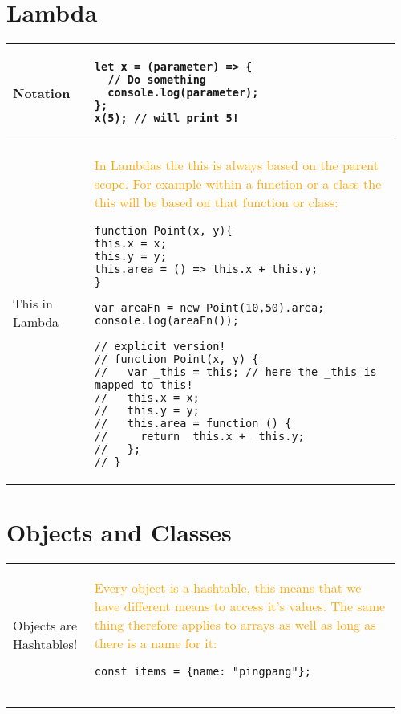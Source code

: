 \documentclass[main.tex,fontsize=8pt,paper=a4,paper=portrait,DIV=calc,]{scrartcl}
\begin{document}
\begin{table}[ht!]
\section{Lambda}
\begin{tabular}{|m{0.2\linewidth}|m{0.755\linewidth}|}
\hline
Notation & 
\begin{lstlisting}
let x = (parameter) => {
  // Do something
  console.log(parameter);
};
x(5); // will print 5!
\end{lstlisting}\\
\hline
This in Lambda &
\textcolor{orange}{In Lambdas the this is always based on the parent scope.\newline
For example within a function or a class the this will be based on that function or class:}\newline
\begin{lstlisting}
function Point(x, y){
this.x = x;
this.y = y;
this.area = () => this.x + this.y;
}

var areaFn = new Point(10,50).area;
console.log(areaFn());

// explicit version!
// function Point(x, y) {
//   var _this = this; // here the _this is mapped to this!
//   this.x = x;
//   this.y = y;
//   this.area = function () {
//     return _this.x + _this.y;
//   };
// }
\end{lstlisting}\\
\hline
\end{tabular}
\section{Objects and Classes}
\begin{tabular}{|m{0.2\linewidth}|m{0.755\linewidth}|}
\hline
Objects are Hashtables! & 
\textcolor{orange}{Every object is a hashtable, this means that we have different means to access it's values. \newline
The same thing therefore applies to arrays as well as long as there is a name for it:}\newline
\begin{lstlisting}
const items = {name: "pingpang"};


\end{lstlisting}
\end{tabular}
\end{table}
\end{document}
